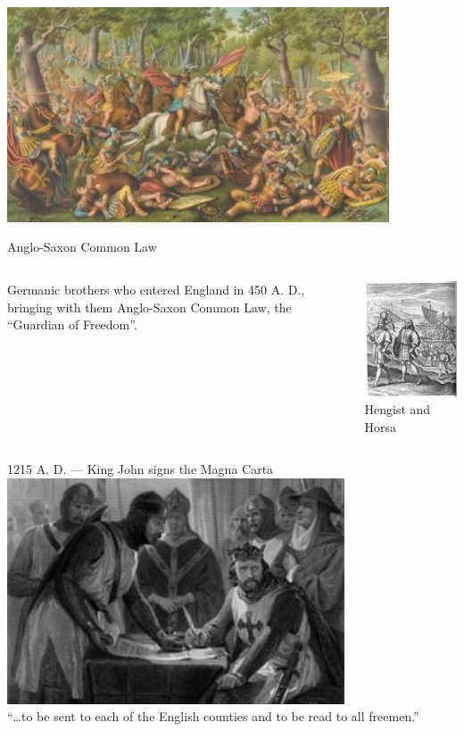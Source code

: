\documentclass{beamer}
\begin{document}
\begin{frame}
    \centering
    \includegraphics[width=0.85\textwidth]{img/teutoburg.png} \\
\end{frame}

\begin{frame}{Anglo-Saxon Common Law}
    \begin{columns}[onlytextwidth]
            Germanic brothers who entered England in 450 A. D., bringing with them Anglo-Saxon Common Law, the ``Guardian of Freedom''.

            \centering
            \includegraphics[height=0.55\textheight]{img/hengist-horsa.png} \\
            Hengist and Horsa \\
    \end{columns}
\end{frame}

\begin{frame}{1215 A. D. --- King John signs the Magna Carta}
    \centering
    \includegraphics[width=0.75\textwidth]{img/king-john.png} \\
    ``\ldots to be sent to each of the English counties and to be read to all freemen.'' \\
\end{frame}
\end{document}
